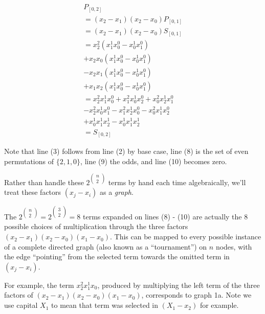 \documentclass[11pt, oneside]{article} 	%
\begin{document}
\begin{align}
P_{[0,2]}  \\
= (x_2-x_1)(x_2-x_0)P_{[0,1]} \\
= (x_2-x_1)(x_2-x_0)S_{[0,1]} \\
= x_2^2(x_1^1x_0^0 - x_0^1x_1^0) \\
+ x_2x_0(x_1^1x_0^0 - x_0^1x_1^0) \\
- x_2x_1 (x_1^1x_0^0 - x_0^1x_1^0) \\
+ x_1x_2(x_1^1x_0^0 - x_0^1x_1^0)  \\
= x_2^2x_1^1x_0^0  + x_1^2x_0^1x_2^0 + x_0^2x_2^1x_1^0   \\
 - x_2^2x_0^1x_1^0 - x_1^2x_2^1x_0^0 - x_0^2x_1^1x_2^0 \\
+ x_0^1x_1^1x_2^1 - x_0^1x_1^1x_2^1 \\
= S_{[0,2]}
\end{align}

Note that line (3) follows from line (2) by base case, line (8) is the set of even permutations of $\{2,1,0\}$, line (9) the odds, and line (10) becomes zero.

Rather than handle these $2^{\begin{pmatrix}n\\2\end{pmatrix}}$ terms by hand each time algebraically, we'll treat these factors $(x_j - x_i)$ as a \emph{graph}.

The $2^{\begin{pmatrix}n\\2\end{pmatrix}} = 2^{\begin{pmatrix}3\\2\end{pmatrix}} = 8$ terms expanded on lines (8) - (10) are actually the 8 possible choices of multiplication through the three factors $(x_2 - x_1)(x_2-x_0)(x_1-x_0)$.  This can be mapped to every possible instance of a complete directed graph (also known as a ``tournament'') on $n$ nodes, with the edge ``pointing'' from the selected term towards the omitted term in $(x_j - x_i)$.

For example, the term $x_2^2x_1^1x_0$, produced by multiplying the left term of the three factors of $(x_2-x_1)(x_2-x_0)(x_1-x_0)$, corresponds to graph 1a.  Note we use capital $X_1$ to mean that term was selected in $(X_1 - x_2)$ for example.
\end{document}
